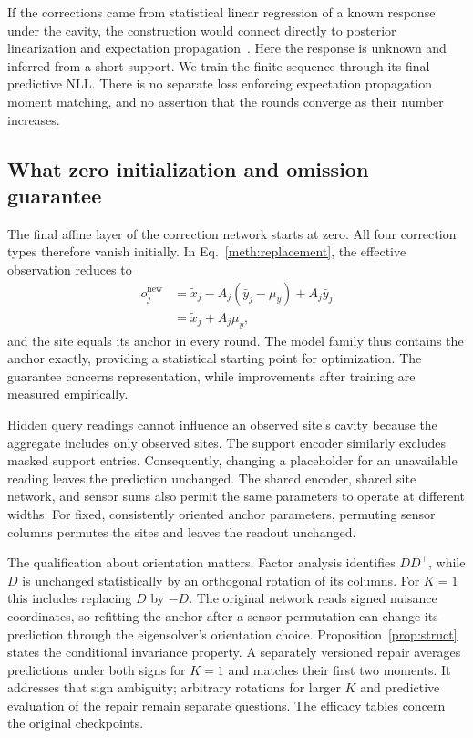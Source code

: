 If the corrections came from statistical linear regression of a known response under the cavity, the construction would connect directly to posterior linearization and expectation propagation~\citep{deisenroth2012ep,garciafernandez2015plf}. Here the response is unknown and inferred from a short support. We train the finite sequence through its final predictive NLL. There is no separate loss enforcing expectation propagation moment matching, and no assertion that the rounds converge as their number increases.

\subsection{What zero initialization and omission guarantee}

The final affine layer of the correction network starts at zero. All four correction types therefore vanish initially. In Eq.~\eqref{meth:replacement}, the effective observation reduces to
\begin{equation}
  \begin{aligned}
  o_j^{\mathrm{new}}
  &=\widetilde x_j-A_j(\bar y_j-\mu_y)+A_j\bar y_j\\
  &=\widetilde x_j+A_j\mu_y,
  \end{aligned}
  \label{meth:zero-head}
\end{equation}
and the site equals its anchor in every round. The model family thus contains the anchor exactly, providing a statistical starting point for optimization. The guarantee concerns representation, while improvements after training are measured empirically.

Hidden query readings cannot influence an observed site's cavity because the aggregate includes only observed sites. The support encoder similarly excludes masked support entries. Consequently, changing a placeholder for an unavailable reading leaves the prediction unchanged. The shared encoder, shared site network, and sensor sums also permit the same parameters to operate at different widths. For fixed, consistently oriented anchor parameters, permuting sensor columns permutes the sites and leaves the readout unchanged.

The qualification about orientation matters. Factor analysis identifies $DD^\top$, while $D$ is unchanged statistically by an orthogonal rotation of its columns. For $K=1$ this includes replacing $D$ by $-D$. The original network reads signed nuisance coordinates, so refitting the anchor after a sensor permutation can change its prediction through the eigensolver's orientation choice. Proposition~\ref{prop:struct} states the conditional invariance property. A separately versioned repair averages predictions under both signs for $K=1$ and matches their first two moments. It addresses that sign ambiguity; arbitrary rotations for larger $K$ and predictive evaluation of the repair remain separate questions. The efficacy tables concern the original checkpoints.

